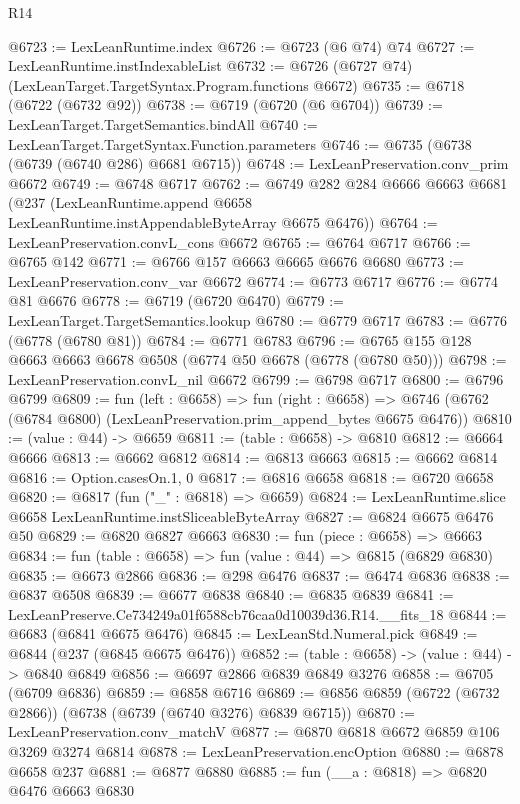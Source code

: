 \begin{lexlean}{R14}
\begin{coremodule}
@6723 := LexLeanRuntime.index
@6726 := @6723 (@6 @74) @74
@6727 := LexLeanRuntime.instIndexableList
@6732 := @6726 (@6727 @74) (LexLeanTarget.TargetSyntax.Program.functions @6672)
@6735 := @6718 (@6722 (@6732 @92))
@6738 := @6719 (@6720 (@6 @6704))
@6739 := LexLeanTarget.TargetSemantics.bindAll
@6740 := LexLeanTarget.TargetSyntax.Function.parameters
@6746 := @6735 (@6738 (@6739 (@6740 @286) @6681 @6715))
@6748 := LexLeanPreservation.conv_prim @6672
@6749 := @6748 @6717
@6762 := @6749
    @282
    @284
    @6666
    @6663
    @6681
    (@237 (LexLeanRuntime.append @6658 LexLeanRuntime.instAppendableByteArray @6675 @6476))
@6764 := LexLeanPreservation.convL_cons @6672
@6765 := @6764 @6717
@6766 := @6765 @142
@6771 := @6766 @157 @6663 @6665 @6676 @6680
@6773 := LexLeanPreservation.conv_var @6672
@6774 := @6773 @6717
@6776 := @6774 @81 @6676
@6778 := @6719 (@6720 @6470)
@6779 := LexLeanTarget.TargetSemantics.lookup
@6780 := @6779 @6717
@6783 := @6776 (@6778 (@6780 @81))
@6784 := @6771 @6783
@6796 := @6765 @155 @128 @6663 @6663 @6678 @6508 (@6774 @50 @6678 (@6778 (@6780 @50)))
@6798 := LexLeanPreservation.convL_nil @6672
@6799 := @6798 @6717
@6800 := @6796 @6799
@6809 := fun (left : @6658) =>
  fun (right : @6658) =>
  @6746 (@6762 (@6784 @6800) (LexLeanPreservation.prim_append_bytes @6675 @6476))
@6810 := (value : @44) -> @6659
@6811 := (table : @6658) -> @6810
@6812 := @6664 @6666
@6813 := @6662 @6812
@6814 := @6813 @6663
@6815 := @6662 @6814
@6816 := Option.casesOn.{1, 0}
@6817 := @6816 @6658
@6818 := @6720 @6658
@6820 := @6817 (fun ("_" : @6818) => @6659)
@6824 := LexLeanRuntime.slice @6658 LexLeanRuntime.instSliceableByteArray
@6827 := @6824 @6675 @6476 @50
@6829 := @6820 @6827 @6663
@6830 := fun (piece : @6658) => @6663
@6834 := fun (table : @6658) => fun (value : @44) => @6815 (@6829 @6830)
@6835 := @6673 @2866
@6836 := @298 @6476
@6837 := @6474 @6836
@6838 := @6837 @6508
@6839 := @6677 @6838
@6840 := @6835 @6839
@6841 := LexLeanPreserve.Ce734249a01f6588cb76caa0d10039d36.R14.__fits_18
@6844 := @6683 (@6841 @6675 @6476)
@6845 := LexLeanStd.Numeral.pick
@6849 := @6844 (@237 (@6845 @6675 @6476))
@6852 := (table : @6658) -> (value : @44) -> @6840 @6849
@6856 := @6697 @2866 @6839 @6849 @3276
@6858 := @6705 (@6709 @6836)
@6859 := @6858 @6716
@6869 := @6856 @6859 (@6722 (@6732 @2866)) (@6738 (@6739 (@6740 @3276) @6839 @6715))
@6870 := LexLeanPreservation.conv_matchV
@6877 := @6870 @6818 @6672 @6859 @106 @3269 @3274 @6814
@6878 := LexLeanPreservation.encOption
@6880 := @6878 @6658 @237
@6881 := @6877 @6880
@6885 := fun (__a : @6818) => @6820 @6476 @6663 @6830

\end{coremodule}
\end{lexlean}
